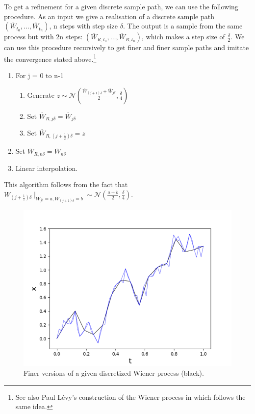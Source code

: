 \begin{samepage}
To get a refinement for a given discrete sample path, we can use the following procedure. As an input we give a realisation of a discrete sample path \((\overline{W}_{t_0},\dots, \overline{W}_{t_n})\), n steps with step size \(\delta\). The output is a sample from the same process but with 2n steps: \(\left(\overline{W}_{R,t_0},\dots,\overline{W}_{R,t_n}\right)\), which makes a step size of \(\frac{\delta}{2}\).
We can use this procedure recursively to get finer and finer sample paths and imitate the convergence stated above.\footnote{See also Paul L\'evy's construction of the Wiener process in \cite{BMIntro} which follows the same idea.}
\begin{algorithm}
\label{alg:Refinement}
\begin{enumerate}[noitemsep,topsep=0mm,labelindent=6mm,leftmargin=*,widest=3.,align=right]
\item For j = 0 to n-1
\begin{enumerate}[noitemsep,topsep=0mm,labelindent=6mm,leftmargin=*,widest=3.,align=right]
\item Generate \(z\sim \mathcal{N}(\frac{\overline{W}_{(j+1)\delta}+\overline{W}_{j\delta}}{2}, \frac{\delta}{4})\)
\item Set \(\overline{W}_{R,j\delta} = \overline{W}_{j\delta}\)
\item Set \(\overline{W}_{R,(j+\frac{1}{2})\delta} = z\)
\end{enumerate}
\item Set \(\overline{W}_{R,n\delta} = \overline{W}_{n\delta}\)
\item Linear interpolation.
\end{enumerate}
\end{algorithm}
This algorithm follows from the fact that \(W_{(j+\frac{1}{2})\delta}\mid_{ \!W_{j\delta}=a,\! W_{(j+1)\delta}\!=b} \sim \mathcal{N}({\frac{a+b}{2}}, \frac{\delta}{4})\).
\begin{figure}[!h]
\centering
  \includegraphics[scale=0.6]{content/Graphics/Figure_RefinementPath2.png}
  \caption{Finer versions of a given discretized Wiener process (black).}
  \label{fig:fig2}
\end{figure}
\end{samepage}
